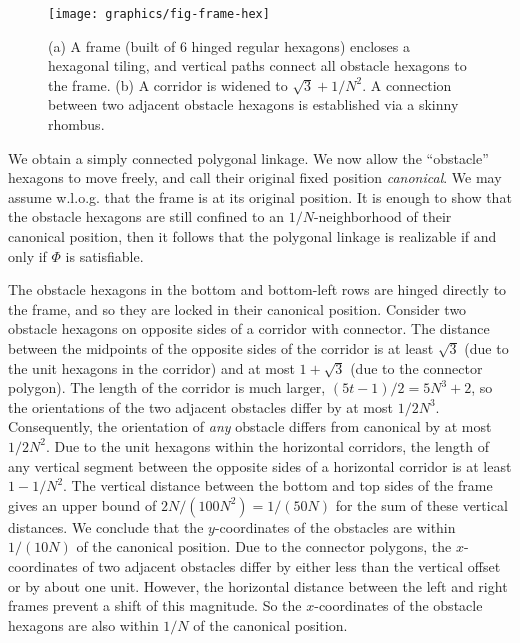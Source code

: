 \begin{figure}[htbp]
	\centering
	\texttt{[image: graphics/fig-frame-hex]}
	\caption{(a) A frame (built of 6 hinged regular hexagons) encloses a hexagonal tiling, and
    vertical paths connect all obstacle hexagons to the frame.
    (b) A corridor is widened to $\sqrt{3}+1/N^2$. A connection between
    two adjacent obstacle hexagons is established via a skinny rhombus.}
	\label{fig:frame}
\end{figure}

We obtain a simply connected polygonal linkage. We now allow the ``obstacle'' hexagons
to move freely, and call their original fixed position \emph{canonical}. We may assume
w.l.o.g. that the frame is at its original position. It is enough to show that the obstacle
hexagons are still confined to an $1/N$-neighborhood of their canonical position, then it
follows that the polygonal linkage is realizable if and only if $\Phi$ is satisfiable.

The obstacle hexagons in the bottom and bottom-left rows are hinged directly to the frame,
and so they are locked in their canonical position. Consider two obstacle hexagons on opposite
sides of a corridor with connector. The distance between the midpoints of the opposite sides of
the corridor is at least $\sqrt{3}$ (due to the unit hexagons in the corridor) and at most
$1+\sqrt{3}$ (due to the connector polygon). The length of the corridor is much larger,
$(5t-1)/2=5N^3+2$, so the orientations of the two adjacent obstacles differ by at most $1/2N^3$.
Consequently, the orientation of \emph{any} obstacle differs from canonical by at most $1/2N^2$.
Due to the unit hexagons within the horizontal corridors, the length of any vertical segment between
the opposite sides of a horizontal corridor is at least $1-1/N^2$. The vertical distance between the
bottom and top sides of the frame gives an upper bound of  $2N/(100N^2)=1/(50N)$ for the sum of these
vertical distances. We conclude that the $y$-coordinates of the obstacles are within $1/(10N)$
of the canonical position. Due to the connector polygons, the $x$-coordinates of
two adjacent obstacles differ by either less than the vertical offset or by about
one unit. However, the horizontal distance between the left and right frames prevent
a shift of this magnitude. So the $x$-coordinates of the obstacle hexagons are also
within $1/N$ of the canonical position.


